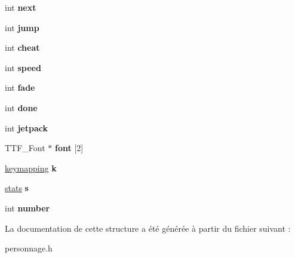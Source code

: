 \begin{DoxyCompactItemize}
\item 
\mbox{\label{structperso_a2215338309a931400f0863fd5041d82b}} 
int {\bfseries next}
\item 
\mbox{\label{structperso_a41362c60ce965d63463fb5fe4aefb519}} 
int {\bfseries jump}
\item 
\mbox{\label{structperso_a436a62035d458f03e914f2a15e92064a}} 
int {\bfseries cheat}
\item 
\mbox{\label{structperso_a2330bb4058a3c590424f7b66f0a1d8ca}} 
int {\bfseries speed}
\item 
\mbox{\label{structperso_aa711c3c9792b3d1463060046d31c2cf9}} 
int {\bfseries fade}
\item 
\mbox{\label{structperso_a27424a1bed94325802586e357d724d4c}} 
int {\bfseries done}
\item 
\mbox{\label{structperso_a7b43c3bd1fc7cc065dfd72963b4b8f5a}} 
int {\bfseries jetpack}
\item 
\mbox{\label{structperso_a72867eb87b2f920b5dd87644d08038a7}} 
T\+T\+F\+\_\+\+Font $\ast$ {\bfseries font} \mbox{[}2\mbox{]}
\item 
\mbox{\label{structperso_a739cb92b3c4545805a4406b29e0e96ed}} 
\hyperlink{structkeymapping}{keymapping} {\bfseries k}
\item 
\mbox{\label{structperso_a6a7f79828e1dbda1bac692606193ec7e}} 
\hyperlink{structstats}{stats} {\bfseries s}
\item 
\mbox{\label{structperso_ac932cb7616724b3cc343975fe7ee191d}} 
int {\bfseries number}
\end{DoxyCompactItemize}


La documentation de cette structure a été générée à partir du fichier suivant \+:\begin{DoxyCompactItemize}
\item 
personnage.\+h\end{DoxyCompactItemize}
